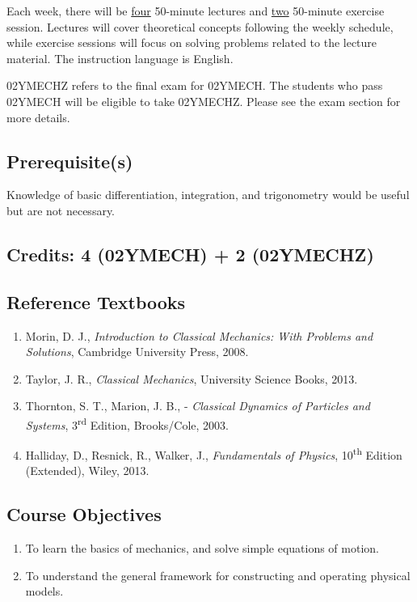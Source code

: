 \documentclass[11pt]{article}
\begin{document}
\vspace{2mm}
Each week, there will be \underline{four} 50-minute lectures and \underline{two} 50-minute exercise session. Lectures will cover theoretical concepts following the weekly schedule, while exercise sessions will focus on solving problems related to the lecture material. The instruction language is English.

\vspace{2mm}
02YMECHZ refers to the final exam for 02YMECH. The students who pass 02YMECH will be eligible to take 02YMECHZ. Please see the exam section for more details.

\subsection*{Prerequisite(s)} 
Knowledge of basic differentiation, integration, and trigonometry would be useful but are not necessary.

\subsection*{Credits: 4 (02YMECH) + 2 (02YMECHZ)}

\vspace{2mm}

\subsection*{Reference Textbooks} 
\begin{enumerate} \itemsep-0.4em
\item Morin, D. J., \emph{Introduction to Classical Mechanics: With Problems and Solutions}, Cambridge University Press, 2008.
\item Taylor, J. R., \emph{Classical Mechanics}, University Science Books, 2013.
\item Thornton, S. T., Marion, J. B., - \emph{Classical Dynamics of Particles and Systems}, 3\textsuperscript{rd} Edition, Brooks/Cole, 2003.
\item Halliday, D., Resnick, R., Walker, J., \emph{Fundamentals of Physics}, 10\textsuperscript{th} Edition (Extended), Wiley, 2013.
\end{enumerate}

\subsection*{\large Course Objectives} 
\begin{enumerate} \itemsep-0.4em
  \item To learn the basics of mechanics, and solve simple equations of motion.
  \item To understand the general framework for constructing and operating physical models.
\end{enumerate}
\end{document}
